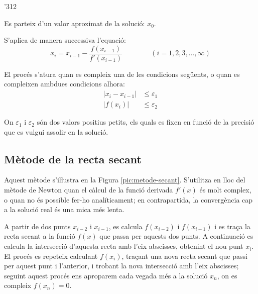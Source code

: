 \begin{dingautolist}{'312}
    \item Es parteix d'un valor aproximat de la solució: $x_0$.

    \item   S'aplica de manera successiva l'equació:
            \begin{equation}\label{eq:newton}
              x_i = x_{i-1} - \frac{f(x_{i-1})}{f'(x_{i-1})} \qquad\qquad (i=1,2,3,\dots,\infty)
            \end{equation}

    \item   El procés s'atura quan es compleix una de les condicions següents, o quan es compleixen ambdues condicions alhora:
            \begin{subequations}\begin{align}
              |x_i - x_{i-1}| &\leq \varepsilon_1 \\
              |f(x_i)| &\leq \varepsilon_2
            \end{align}\end{subequations}

            On $\varepsilon_1$ i $\varepsilon_2$ són dos valors positius petits, els quals es fixen en funció de la precisió que es vulgui assolir en la solució.
\end{dingautolist}



\subsection{Mètode de la recta secant}

Aquest mètode s'iŀlustra en la Figura \vref{pic:metode-secant}. S'utilitza en lloc del mètode de Newton quan el càlcul de  la funció derivada $f'(x)$ és molt complex, o quan no és possible fer-ho analíticament; en contrapartida, la convergència cap a la solució real és una
mica més lenta.

A partir de dos punts $x_{i-2}$ i $x_{i-1}$, es calcula $f(x_{i-2})$ i $f(x_{i-1})$ i es traça la recta secant a la funció $f(x)$ que passa per aquests dos punts. A continuació es calcula la intersecció d'aquesta recta amb l'eix abscisses, obtenint el nou punt $x_i$. El procés es repeteix calculant $f(x_i)$, traçant una nova recta secant que passi per aquest punt i l'anterior, i trobant la nova intersecció amb l'eix abscisses; seguint aquest procés ens aproparem cada vegada més a la solució $x_n$, on es compleix $f(x_n)=0$.

